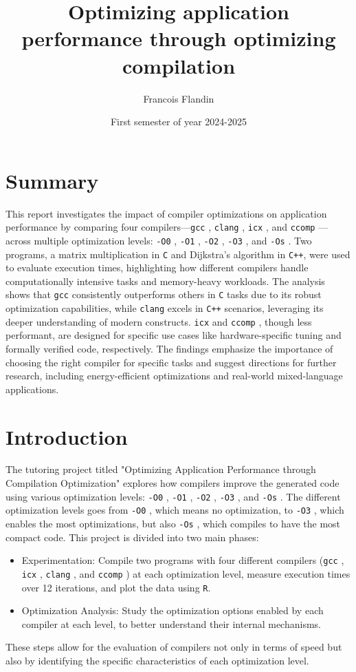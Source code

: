 \documentclass{rapport}
\title{Optimizing application performance through optimizing compilation}
\author{Francois Flandin}
\date{First semester of year 2024-2025}
\newcommand{\gcc}{\texttt{gcc} }
\newcommand{\icx}{\texttt{icx} }
\newcommand{\clang}{\texttt{clang} }
\newcommand{\comp}{\texttt{ccomp} }
\newcommand{\optizero}{\texttt{-O0} }
\newcommand{\optione}{\texttt{-O1} }
\newcommand{\optitwo}{\texttt{-O2} }
\newcommand{\optithree}{\texttt{-O3} }
\newcommand{\optisize}{\texttt{-Os} }
\begin{document}
\maketitle


\clearpage
\tableofcontents

\clearpage
\section*{Summary}
This report investigates the impact of compiler optimizations on application performance by comparing four compilers—\gcc, \clang, \icx, and \comp—across multiple optimization levels: 
\optizero, \optione, \optitwo, \optithree, and \optisize. 
\newline
Two programs, a matrix multiplication in \texttt{C} and Dijkstra’s algorithm in \texttt{C++}, were used to evaluate execution 
times, highlighting how different compilers handle computationally intensive tasks and memory-heavy workloads. 
\newline
The analysis shows that \gcc consistently outperforms others in \texttt{C}
tasks due to its robust optimization capabilities, while \clang excels in \texttt{C++} scenarios, leveraging its deeper understanding of modern constructs. \newline
\icx and \comp, though less performant, are designed for specific use cases like hardware-specific tuning and formally verified code, respectively. The findings emphasize the importance 
of choosing the right compiler for specific tasks and suggest directions for further research, including energy-efficient optimizations and real-world mixed-language applications.
\clearpage
\section*{Introduction}
The tutoring project titled "Optimizing Application Performance through Compilation Optimization" explores how compilers improve the generated code 
using various optimization levels: \optizero, \optione, \optitwo, \optithree, and \optisize. \newline
The different optimization levels goes from \optizero, which means no optimization, to \optithree, which enables the most optimizations, but also \optisize, which
compiles to have the most compact code.\newline
This project is divided into two main phases:
\begin{itemize}
    \item Experimentation: Compile two programs with four different compilers (\gcc, \icx, \clang, and \comp) at each optimization level, 
    measure execution times over 12 iterations, and plot the data using \texttt{R}.
    \item Optimization Analysis: Study the optimization options enabled by each compiler at each level, to better understand their internal mechanisms.
\end{itemize}
These steps allow for the evaluation of compilers not only in terms of speed but also by identifying the specific characteristics of each optimization level.
\end{document}
